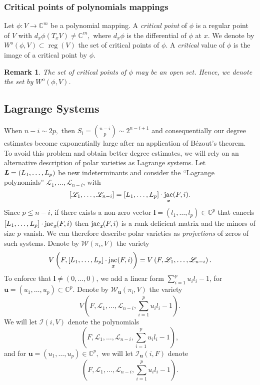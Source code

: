 \documentclass[a4paper]{article}
\def\sW{\mathscr{W}}
\def\sI{\mathscr{I}}
\def\Lb{\textit{\textbf{L}}}
\def\ub{{\bm u}}
\def\lb{{\bm l}}
\def\xb{\textit{\textbf{x}}}
\DeclareMathOperator{\jac}{jac}
\DeclareMathOperator{\reg}{reg}
\def\C{\mathbb{C}}
\def\ji{\jac_{\xb}(F,i)}
\def\Iil{\mathscr{I}_{\ub}(i,F)}
\def\Wil{\mathscr{W}_{\ub}(\pi_i,V)}
\def\udl{\sum_{i=1}^pu_il_i}
\newtheorem{remark}[theorem]{Remark}
\begin{document}
\subsubsection{Critical points of polynomials mappings}
Let $\phi : V \rightarrow \C^m$ be a polynomial mapping. A \textit{critical point} of $\phi$ is a regular point of $V$ with $d_x \phi(T_xV) \not = \C^m,$ where $d_x \phi$ is the differential of $\phi$ at $x.$ We denote by $W^o(\phi,V) \subset \reg(V)$ the set of critical points of $\phi.$ A \textit{critical} value of $\phi$ is the image of a critical point by $\phi$.
\begin{remark}
The set of critical points of $\phi$ may be an open set. Hence, we denote the set by $W^o(\phi,V)$.
\end{remark}



\subsection{Lagrange Systems} 
%
When $n-i \sim 2p,$ 
then $S_i = \binom{n-i}{p}\sim 2^{n-i+1}$ and consequentially our degree estimates become exponentially large after an application of B\'ezout’s theorem. To avoid this problem and obtain better degree estimates, we will rely on an alternative description of polar varieties as Lagrange systems. Let $\Lb = (L_1,\hdots,L_p)$ be new indeterminants and consider the ``Lagrange polynomials'' $\mathscr{L}_1,\dots,\mathscr{L}_{n-i}$, with
\[
[\mathscr{L}_1, \hdots, \mathscr{L}_{n-i}]=[L_1,\hdots,L_p]\cdot \jac_{\xb} (F,i).
\] 
Since $p \leq n-i$, if there exists a non-zero vector $\lb = (l_1,\hdots,l_p) \in \C^p$ that cancels $[L_1,\hdots,L_p]\cdot \ji$ then $\ji$ is a rank deficient matrix and the minors of size $p$ vanish. We can therefore describe polar varieties as \textit{projections} of zeros of such systems. Denote by $\sW(\pi_i,V)$ the variety
\[
V\left(F, [L_1,\hdots,L_p] \cdot \ji\right)
=
V\left(F, \mathscr{L}_1,\dots,\mathscr{L}_{n-i}\right).
\]
To enforce that $\lb \not = (0,\hdots,0)$, we add a linear form $\udl-1$, for $\ub = (u_1,\hdots,u_p) \subset \C^p.$ Denote by $\Wil$ the variety
\[
V\left(F, \mathscr{L}_1, \hdots, \mathscr{L}_{n-i},\udl-1\right).
\]
We will let $\sI(i,V)$
denote the polynomials 
\[
\left( F, \mathscr{L}_1, \hdots, \mathscr{L}_{n-i},\udl-1 \right),
\]
and for $\ub = (u_1,\hdots,u_p) \in \C^p,$ we will let $\Iil$
denote 
\[
\left( F, \mathscr{L}_1, \hdots, \mathscr{L}_{n-i},\udl-1 \right).
\]
\end{document}
